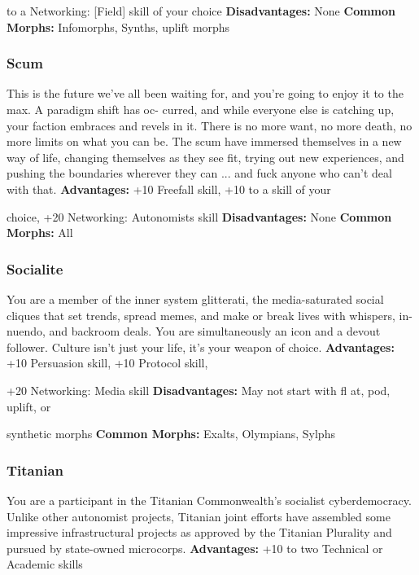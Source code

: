to a Networking: [Field] skill of your choice
\textbf{Disadvantages:} None
\textbf{Common Morphs:} Infomorphs, Synths, uplift morphs

\subsubsection{Scum}

This is the future we've all been waiting for, and you're 
going to enjoy it to the max. A paradigm shift has oc-
curred, and while everyone else is catching up, your 
faction embraces and revels in it. There is no more 
want, no more death, no more limits on what you can 
be. The scum have immersed themselves in a new way 
of life, changing themselves as they see fit, trying out 
new experiences, and pushing the boundaries wherever 
they can ... and fuck anyone who can't deal with that.
\textbf{Advantages:} +10 Freefall skill, +10 to a skill of your 

choice, +20 Networking: Autonomists skill
\textbf{Disadvantages:} None
\textbf{Common Morphs:} All

\subsubsection{Socialite}

You are a member of the inner system glitterati, the 
media-saturated social cliques that set trends, spread 
memes, and make or break lives with whispers, in-
nuendo, and backroom deals. You are simultaneously 
an icon and a devout follower. Culture isn't just your 
life, it's your weapon of choice.
\textbf{Advantages:} +10 Persuasion skill, +10 Protocol skill, 

+20 Networking: Media skill
\textbf{Disadvantages:} May not start with fl at, pod, uplift, or 

synthetic morphs
\textbf{Common Morphs:} Exalts, Olympians, Sylphs

\subsubsection{Titanian}

You are a participant in the Titanian Commonwealth's 
socialist cyberdemocracy. Unlike other autonomist 
projects, Titanian joint efforts have assembled some 
impressive infrastructural projects as approved by 
the Titanian Plurality and pursued by state-owned 
microcorps.
\textbf{Advantages:} +10 to two Technical or Academic skills 

